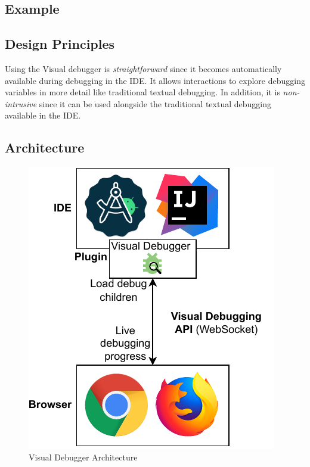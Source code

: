 \documentclass[sigconf]{acmart}
\begin{document}
\subsection{Example}




\subsection{Design Principles}
Using the Visual debugger is \textit{straightforward} since it becomes automatically available during debugging in the IDE.
It allows interactions to explore debugging variables in more detail like traditional textual debugging.
In addition, it is \textit{non-intrusive} since it can be used alongside the traditional textual debugging available in the IDE.


\subsection{Architecture}

\begin{figure}[ht]
  \centering
  \includegraphics[width=0.7\linewidth]{images/visual-debugger.pdf}
  \caption{Visual Debugger Architecture}
\end{figure}
\end{document}
